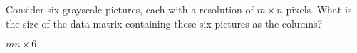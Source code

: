 Consider six grayscale pictures, each with a resolution of $m \times n$ pixels. What is the size of the data matrix containing these six pictures as the columns?

\begin{solution}
    $mn \times 6$
\end{solution}